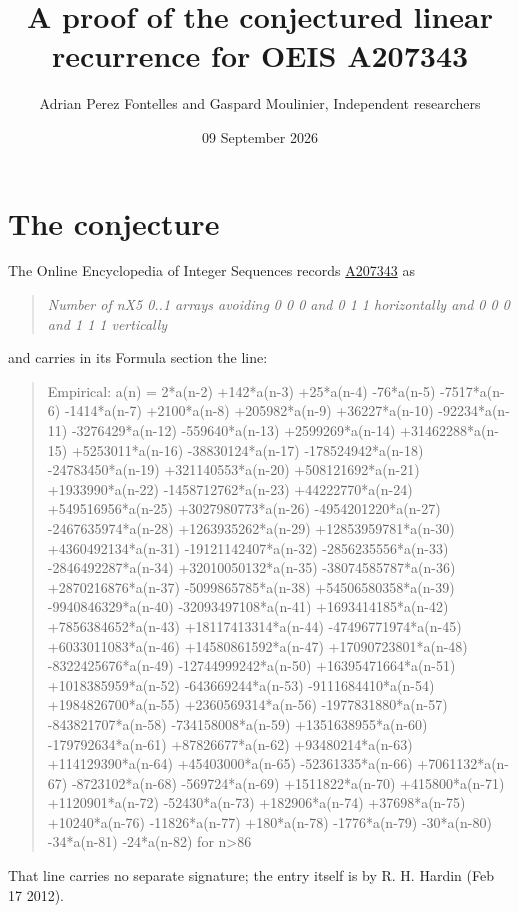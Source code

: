 \documentclass[11pt]{article}
\title{A proof of the conjectured linear recurrence for OEIS A207343}
\author{Adrian Perez Fontelles and Gaspard Moulinier, Independent researchers}
\date{09 September 2026}
\theoremstyle{definition}
\begin{document}
\maketitle
\section{The conjecture}

The Online Encyclopedia of Integer Sequences records \href{https://oeis.org/A207343}{A207343} as

\begin{quote}\itshape Number of nX5 0..1 arrays avoiding 0 0 0 and 0 1 1 horizontally and 0 0 0 and 1 1 1 vertically\end{quote}

and carries in its Formula section the line:

\begin{quote}\ttfamily Empirical: a(n) = 2*a(n-2) +142*a(n-3) +25*a(n-4) -76*a(n-5) -7517*a(n-6) -1414*a(n-7) +2100*a(n-8) +205982*a(n-9) +36227*a(n-10) -92234*a(n-11) -3276429*a(n-12) -559640*a(n-13) +2599269*a(n-14) +31462288*a(n-15) +5253011*a(n-16) -38830124*a(n-17) -178524942*a(n-18) -24783450*a(n-19) +321140553*a(n-20) +508121692*a(n-21) +1933990*a(n-22) -1458712762*a(n-23) +44222770*a(n-24) +549516956*a(n-25) +3027980773*a(n-26) -4954201220*a(n-27) -2467635974*a(n-28) +1263935262*a(n-29) +12853959781*a(n-30) +4360492134*a(n-31) -19121142407*a(n-32) -2856235556*a(n-33) -2846492287*a(n-34) +32010050132*a(n-35) -38074585787*a(n-36) +2870216876*a(n-37) -5099865785*a(n-38) +54506580358*a(n-39) -9940846329*a(n-40) -32093497108*a(n-41) +1693414185*a(n-42) +7856384652*a(n-43) +18117413314*a(n-44) -47496771974*a(n-45) +6033011083*a(n-46) +14580861592*a(n-47) +17090723801*a(n-48) -8322425676*a(n-49) -12744999242*a(n-50) +16395471664*a(n-51) +1018385959*a(n-52) -643669244*a(n-53) -9111684410*a(n-54) +1984826700*a(n-55) +2360569314*a(n-56) -1977831880*a(n-57) -843821707*a(n-58) -734158008*a(n-59) +1351638955*a(n-60) -179792634*a(n-61) +87826677*a(n-62) +93480214*a(n-63) +114129390*a(n-64) +45403000*a(n-65) -52361335*a(n-66) +7061132*a(n-67) -8723102*a(n-68) -569724*a(n-69) +1511822*a(n-70) +415800*a(n-71) +1120901*a(n-72) -52430*a(n-73) +182906*a(n-74) +37698*a(n-75) +10240*a(n-76) -11826*a(n-77) +180*a(n-78) -1776*a(n-79) -30*a(n-80) -34*a(n-81) -24*a(n-82) for n>86\end{quote}

That line carries no separate signature; the entry itself is by R. H. Hardin (Feb 17 2012).
\end{document}
